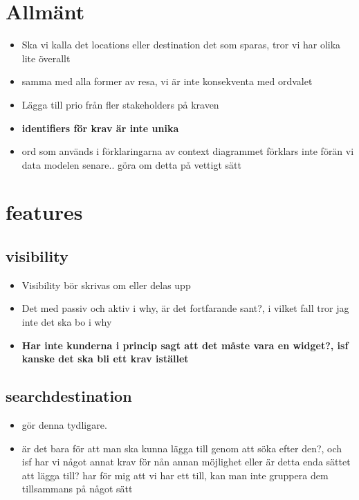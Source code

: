 \documentclass[a4paper]{article}
\begin{document}
	\thispagestyle{empty}
	\setcounter{page}{0}
	\pagebreak
	\tableofcontents
	\pagebreak

\section{Allmänt}
\begin{itemize}

	\item Ska vi kalla det locations eller destination det som sparas, tror vi har olika lite överallt
	\item samma med alla former av resa, vi är inte konsekventa med ordvalet
	\item Lägga till prio från fler stakeholders på kraven
	\item \textbf{identifiers för krav är inte unika}
	\item ord som används i förklaringarna av context diagrammet förklars inte förän vi data modelen senare.. göra om detta på vettigt sätt
\end{itemize}


\section{features}
	\subsection{visibility}
		\begin{itemize}
			\item Visibility bör skrivas om eller delas upp
			\item Det med passiv och aktiv i why, är det fortfarande sant?, i vilket fall tror jag inte det ska bo i why
			\item \textbf{Har inte kunderna i princip sagt att det måste vara en widget?, isf kanske det ska bli ett krav istället}

		\end{itemize}

	\subsection{searchdestination}
		\begin{itemize}
			\item gör denna tydligare. 
			\item är det bara för att man ska kunna lägga till genom att söka efter den?, och isf har vi något annat krav för nån annan möjlighet eller är detta enda sättet att lägga till? har för mig att vi har ett till, kan man inte gruppera dem tillsammans på något sätt
		\end{itemize}
		
\end{document}
